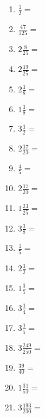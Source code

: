 \documentclass[12pt]{article}
\begin{document}
\begin{enumerate}
\item \large $ \frac{1}{2} = $ \vspace{1.5cm}
\newpage
\item \large $ \frac{47}{125} = $ \vspace{1.5cm}
\item \large $ 2 \frac{8}{25} = $ \vspace{1.5cm}
\item \large $ 2 \frac{19}{25} = $ \vspace{1.5cm}
\item \large $ 2 \frac{1}{8} = $ \vspace{1.5cm}
\item \large $ 1 \frac{1}{8} = $ \vspace{1.5cm}
\item \large $ 3 \frac{1}{2} = $ \vspace{1.5cm}
\item \large $ 2 \frac{17}{20} = $ \vspace{1.5cm}
\item \large $ \frac{4}{5} = $ \vspace{1.5cm}
\item \large $ 2 \frac{17}{20} = $ \vspace{1.5cm}
\item \large $ 1 \frac{23}{25} = $ \vspace{1.5cm}
\newpage
\item \large $ 3 \frac{3}{8} = $ \vspace{1.5cm}
\item \large $ \frac{1}{5} = $ \vspace{1.5cm}
\item \large $ 2 \frac{1}{2} = $ \vspace{1.5cm}
\item \large $ 1 \frac{3}{5} = $ \vspace{1.5cm}
\item \large $ 3 \frac{1}{4} = $ \vspace{1.5cm}
\item \large $ 3 \frac{1}{5} = $ \vspace{1.5cm}
\item \large $ 3 \frac{249}{250} = $ \vspace{1.5cm}
\item \large $ \frac{39}{40} = $ \vspace{1.5cm}
\item \large $ 1 \frac{31}{50} = $ \vspace{1.5cm}
\item \large $ 3 \frac{193}{200} = $ \vspace{1.5cm}

\end{enumerate}
\end{document}
